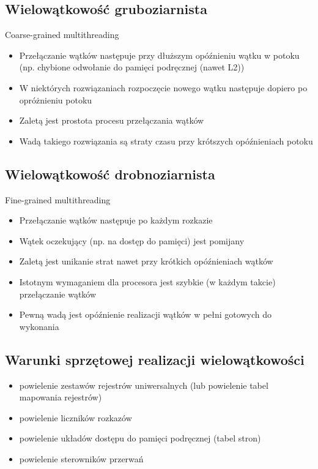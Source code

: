 		\subsection*{Wielowątkowość gruboziarnista}
		Coarse-grained multithreading
		\begin{itemize}
			\item Przełączanie wątków następuje przy dłuższym opóźnieniu wątku w potoku (np. chybione odwołanie do pamięci podręcznej (nawet L2))
			\item W niektórych rozwiązaniach rozpoczęcie nowego wątku następuje dopiero po opróżnieniu potoku
			\item Zaletą jest prostota procesu przełączania wątków
			\item Wadą takiego rozwiązania są straty czasu przy krótszych opóźnieniach potoku
		\end{itemize}
		\subsection*{Wielowątkowość drobnoziarnista}
		Fine-grained multithreading
		\begin{itemize}
			\item Przełączanie wątków następuje po każdym rozkazie
			\item Wątek oczekujący (np. na dostęp do pamięci) jest pomijany
			\item Zaletą jest unikanie strat nawet przy krótkich opóźnieniach wątków
			\item Istotnym wymaganiem dla procesora jest szybkie (w każdym takcie) przełączanie wątków
			\item Pewną wadą jest opóźnienie realizacji wątków w pełni gotowych do wykonania
		\end{itemize}
		\subsection*{Warunki sprzętowej realizacji wielowątkowości}
		\begin{itemize}
			\item powielenie zestawów rejestrów uniwersalnych (lub powielenie tabel mapowania rejestrów)
			\item powielenie liczników rozkazów
			\item powielenie układów dostępu do pamięci podręcznej (tabel stron)
			\item powielenie sterowników przerwań
		\end{itemize}
